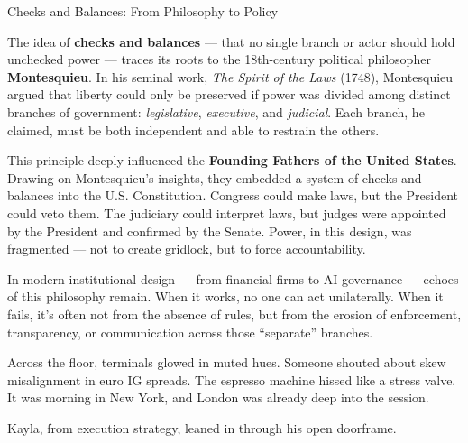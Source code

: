 \begin{HistoricalSidebar}{Checks and Balances: From Philosophy to Policy}

  The idea of \textbf{checks and balances} — that no single branch or actor should hold unchecked power — traces its 
  roots to the 18th-century political philosopher \textbf{Montesquieu}. In his seminal work, \textit{The Spirit of the 
  Laws} (1748), Montesquieu argued that liberty could only be preserved if power was divided among distinct branches 
  of government: \textit{legislative}, \textit{executive}, and \textit{judicial}. Each branch, he claimed, must be 
  both independent and able to restrain the others.
  
  This principle deeply influenced the \textbf{Founding Fathers of the United States}. Drawing on Montesquieu’s insights, 
  they embedded a system of checks and balances into the U.S. Constitution. Congress could make laws, but the President 
  could veto them. The judiciary could interpret laws, but judges were appointed by the President and confirmed by the 
  Senate. Power, in this design, was fragmented — not to create gridlock, but to force accountability.
  
  \medskip
  
  In modern institutional design — from financial firms to AI governance — echoes of this philosophy remain. When it works, 
  no one can act unilaterally. When it fails, it’s often not from the absence of rules, but from the erosion of enforcement, 
  transparency, or communication across those “separate” branches.
  
\end{HistoricalSidebar}

\medskip

Across the floor, terminals glowed in muted hues. Someone shouted about skew misalignment in euro IG spreads. The espresso 
machine hissed like a stress valve.  It was morning in New York, and London was already deep into the session.

Kayla, from execution strategy, leaned in through his open doorframe.

\medskip

